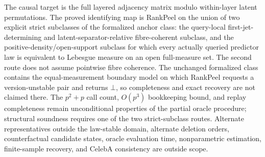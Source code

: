 \documentclass{article}
\begin{document}
The causal target is the full layered adjacency matrix modulo within-layer latent permutations.  The proved identifying map is RankPeel on the union of two explicit strict subclasses of the formalized anchor class: the query-local first-jet-determining and latent-separator-relative fibre-coherent subclass, and the positive-density/open-support subclass for which every actually queried predictor law is equivalent to Lebesgue measure on an open full-measure set.  The second route does not assume pointwise fibre coherence.  The unchanged formalized class contains the equal-measurement boundary model on which RankPeel requests a version-unstable pair and returns \(\bot\), so completeness and exact recovery are not claimed there.  The \(p^2+p\) call count, \(O(p^3)\) bookkeeping bound, and replay completeness remain unconditional properties of the partial oracle procedure; structural soundness requires one of the two strict-subclass routes.  Alternate representatives outside the law-stable domain, alternate deletion orders, counterfactual candidate states, oracle evaluation time, nonparametric estimation, finite-sample recovery, and CelebA consistency are outside scope.
\end{document}

